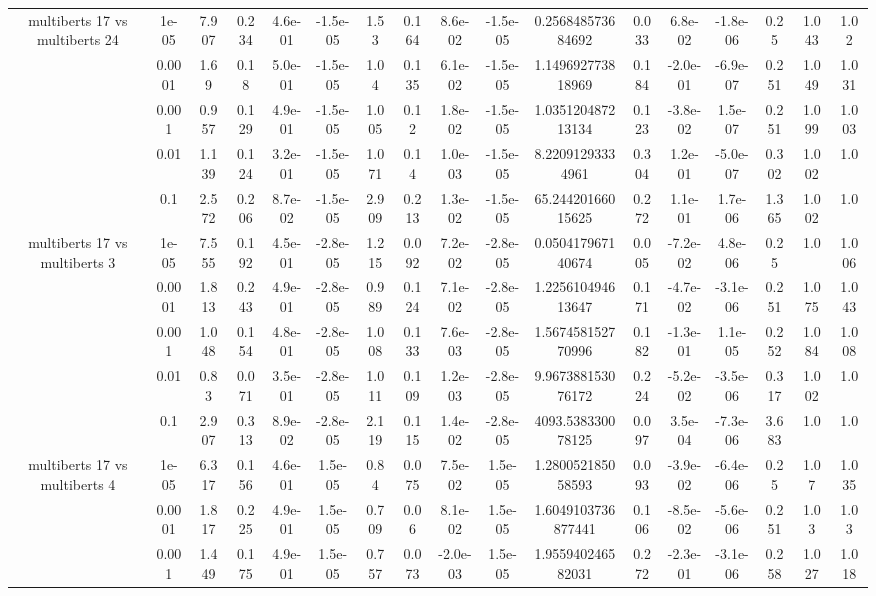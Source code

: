 \begin{tabular}{|c|c|c|c|c|c|c|c|c|c|c|c|c|c|c|c|c|}
\hline
\multirow{5}{*}{multiberts 17 vs multiberts 24} & 1e-05 & 7.907 & 0.234 & 4.6e-01 & -1.5e-05 & 1.53 & 0.164 & 8.6e-02 & -1.5e-05 & 0.256848573684692 & 0.033 & 6.8e-02 & -1.8e-06 & 0.25 & 1.043 & 1.02 \\
 & 0.0001 & 1.69 & 0.18 & 5.0e-01 & -1.5e-05 & 1.04 & 0.135 & 6.1e-02 & -1.5e-05 & 1.149692773818969 & 0.184 & -2.0e-01 & -6.9e-07 & 0.251 & 1.049 & 1.031 \\
 & 0.001 & 0.957 & 0.129 & 4.9e-01 & -1.5e-05 & 1.005 & 0.12 & 1.8e-02 & -1.5e-05 & 1.035120487213134 & 0.123 & -3.8e-02 & 1.5e-07 & 0.251 & 1.099 & 1.003 \\
 & 0.01 & 1.139 & 0.124 & 3.2e-01 & -1.5e-05 & 1.071 & 0.14 & 1.0e-03 & -1.5e-05 & 8.22091293334961 & 0.304 & 1.2e-01 & -5.0e-07 & 0.302 & 1.002 & 1.0 \\
 & 0.1 & 2.572 & 0.206 & 8.7e-02 & -1.5e-05 & 2.909 & 0.213 & 1.3e-02 & -1.5e-05 & 65.24420166015625 & 0.272 & 1.1e-01 & 1.7e-06 & 1.365 & 1.002 & 1.0 \\
\hline
\multirow{5}{*}{multiberts 17 vs multiberts 3} & 1e-05 & 7.555 & 0.192 & 4.5e-01 & -2.8e-05 & 1.215 & 0.092 & 7.2e-02 & -2.8e-05 & 0.050417967140674 & 0.005 & -7.2e-02 & 4.8e-06 & 0.25 & 1.0 & 1.006 \\
 & 0.0001 & 1.813 & 0.243 & 4.9e-01 & -2.8e-05 & 0.989 & 0.124 & 7.1e-02 & -2.8e-05 & 1.225610494613647 & 0.171 & -4.7e-02 & -3.1e-06 & 0.251 & 1.075 & 1.043 \\
 & 0.001 & 1.048 & 0.154 & 4.8e-01 & -2.8e-05 & 1.008 & 0.133 & 7.6e-03 & -2.8e-05 & 1.567458152770996 & 0.182 & -1.3e-01 & 1.1e-05 & 0.252 & 1.084 & 1.008 \\
 & 0.01 & 0.83 & 0.071 & 3.5e-01 & -2.8e-05 & 1.011 & 0.109 & 1.2e-03 & -2.8e-05 & 9.967388153076172 & 0.224 & -5.2e-02 & -3.5e-06 & 0.317 & 1.002 & 1.0 \\
 & 0.1 & 2.907 & 0.313 & 8.9e-02 & -2.8e-05 & 2.119 & 0.115 & 1.4e-02 & -2.8e-05 & 4093.538330078125 & 0.097 & 3.5e-04 & -7.3e-06 & 3.683 & 1.0 & 1.0 \\
\hline
\multirow{5}{*}{multiberts 17 vs multiberts 4} & 1e-05 & 6.317 & 0.156 & 4.6e-01 & 1.5e-05 & 0.84 & 0.075 & 7.5e-02 & 1.5e-05 & 1.280052185058593 & 0.093 & -3.9e-02 & -6.4e-06 & 0.25 & 1.07 & 1.035 \\
 & 0.0001 & 1.817 & 0.225 & 4.9e-01 & 1.5e-05 & 0.709 & 0.06 & 8.1e-02 & 1.5e-05 & 1.6049103736877441 & 0.106 & -8.5e-02 & -5.6e-06 & 0.251 & 1.03 & 1.03 \\
 & 0.001 & 1.449 & 0.175 & 4.9e-01 & 1.5e-05 & 0.757 & 0.073 & -2.0e-03 & 1.5e-05 & 1.955940246582031 & 0.272 & -2.3e-01 & -3.1e-06 & 0.258 & 1.027 & 1.018 \\

\end{tabular}
